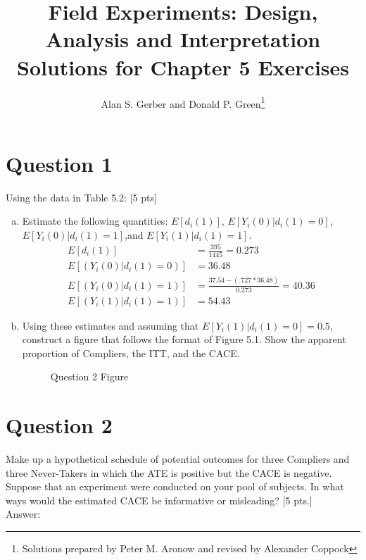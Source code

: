 \documentclass[11pt,notitlepage]{article}\usepackage[]{graphicx}\usepackage[]{color}
\title{Field Experiments: Design, Analysis and Interpretation \\
Solutions for Chapter 5 Exercises}
\author{Alan S. Gerber and Donald P. Green\footnote{Solutions prepared by Peter M. Aronow and revised by Alexander Coppock}}
\date{\vspace{-5ex}}
\begin{document}
\maketitle

\section*{Question 1}
Using the data in Table 5.2: [5 pts]
\begin{enumerate}[a)]
\item Estimate the following quantities: $E[d_i(1)]$, $E[Y_i(0)|d_i(1) = 0]$, $E[Y_i(0)| d_i(1) = 1]$,and $E[Y_i(1)|d_i(1)=1]$.\\
\begin{align*}
E[d_i(1)] &= \frac{395}{1445} = 0.273\\
E[(Y_i(0)|d_i(1) = 0)] &= 36.48\\
E[(Y_i(0)|d_i(1) = 1)] &= \frac{37.54 - (.727*36.48)}{0.273} = 40.36\\
E[(Y_i(1)|d_i(1) = 1)] &= 54.43
\end{align*}

\item Using these estimates and assuming that $E[Y_i(1)|d_i(1) = 0] = 0.5$, construct a figure that follows the format of Figure 5.1. Show the apparent proportion of Compliers, the ITT, and the CACE.

\begin{figure}[H]
    \centering
        \caption{Question 2 Figure}
    \qquad
\end{figure}

\end{enumerate}


\section*{Question 2}
Make up a hypothetical schedule of potential outcomes for three Compliers and three Never-Takers in which the ATE is positive but the CACE is negative. Suppose that an experiment were conducted on your pool of subjects. In what ways would the estimated CACE be informative or misleading? [5 pts.]\\
Answer:\\
\end{document}
